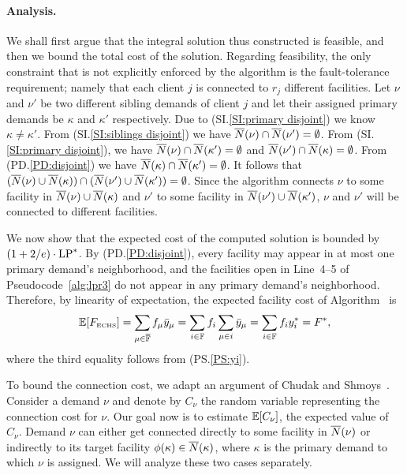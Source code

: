 \documentclass[oneside,final]{ucr}
\begin{document}

\paragraph{Analysis.}
We shall first argue that the integral solution thus
constructed is feasible, and then we bound the total cost of
the solution. Regarding feasibility, the only constraint
that is not explicitly enforced by the algorithm is the
fault-tolerance requirement; namely that each client $j$ is
connected to $r_j$ different facilities. Let $\nu$ and
$\nu'$ be two different sibling demands of client $j$ and let
their assigned primary demands be $\kappa$ and $\kappa'$
respectively. Due to (SI.\ref{SI:primary
  disjoint}) we know $\kappa \neq \kappa'$. From
(SI.\ref{SI:siblings disjoint}) we have ${\overline{N}}(\nu) \cap
{\overline{N}}(\nu') = \emptyset$. From (SI.\ref{SI:primary
  disjoint}), we have ${\overline{N}}(\nu) \cap {\overline{N}}(\kappa') =
\emptyset$ and ${\overline{N}}(\nu') \cap {\overline{N}}(\kappa) =
\emptyset$. From (PD.\ref{PD:disjoint}) we have
${\overline{N}}(\kappa)\cap {\overline{N}}(\kappa') = \emptyset$. It follows
that $({\overline{N}}(\nu) \cup {\overline{N}}(\kappa)) \cap ({\overline{N}}(\nu')
\cup {\overline{N}}(\kappa')) = \emptyset$. Since the algorithm
connects $\nu$ to some facility in ${\overline{N}}(\nu) \cup
{\overline{N}}(\kappa)$ and $\nu'$ to some facility in ${\overline{N}}(\nu')
\cup {\overline{N}}(\kappa')$, $\nu$ and $\nu'$ will be connected to
different facilities.



\smallskip
We now show that the expected cost of the computed solution is bounded by
$(1+2/e) \cdot \mbox{\rm LP}^\ast$. By
(PD.\ref{PD:disjoint}), every facility may appear in at
most one primary demand's neighborhood, and the facilities
open in Line~4--5 of Pseudocode~\ref{alg:lpr3} do not appear
in any primary demand's neighborhood. Therefore, by
linearity of expectation, the expected facility cost of
Algorithm~{\ECHS} is 
%
\begin{equation*}
\mathbb{E}[F_{\mbox{\tiny\rm ECHS}}] 
	= \sum_{\mu\in\overline{\mathbb{F}}} f_\mu {\bar y}_{\mu} 
	= \sum_{i\in\mathbb{F}} f_i\sum_{\mu\in i} {\bar y}_{\mu} 
	= \sum_{i\in\mathbb{F}} f_i y_i^\ast = F^\ast,
\end{equation*}
%
where the third equality follows from (PS.\ref{PS:yi}).

\smallskip

To bound the connection cost, we adapt an argument of Chudak
and Shmoys~\cite{ChudakS04}. Consider a demand $\nu$ and denote by $C_\nu$ the
random variable representing the connection cost for $\nu$.
Our goal now is to estimate $\mathbb{E}[C_\nu]$, the expected value of $C_\nu$.
Demand $\nu$ can either get connected directly to some facility in
${\overline{N}}(\nu)$ or indirectly to its target facility $\phi(\kappa)\in
{\overline{N}}(\kappa)$, where $\kappa$ is the primary demand to
which $\nu$ is assigned. We will analyze these two cases separately.
\end{document}
